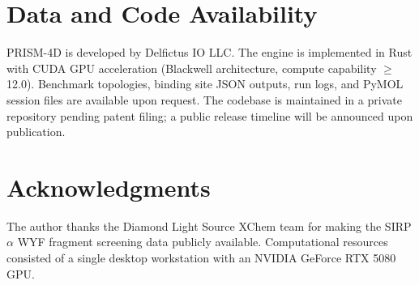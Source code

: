 \documentclass{sn-jnl}
\begin{document}
\section{Data and Code Availability}

PRISM-4D is developed by Delfictus IO LLC. The engine is implemented in Rust with CUDA GPU
acceleration (Blackwell architecture, compute capability $\geq$12.0). Benchmark topologies,
binding site JSON outputs, run logs, and PyMOL session files are available upon request.
The codebase is maintained in a private repository pending patent filing; a public release
timeline will be announced upon publication.

\section*{Acknowledgments}

The author thanks the Diamond Light Source XChem team for making the SIRP$\alpha$ WYF
fragment screening data publicly available. Computational resources consisted of a single
desktop workstation with an NVIDIA GeForce RTX 5080 GPU.
\end{document}
